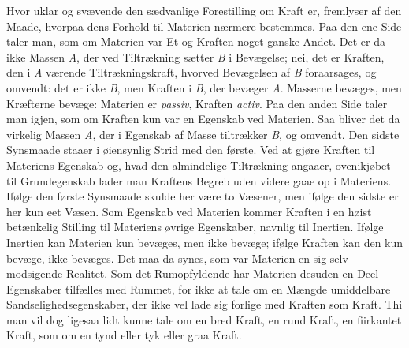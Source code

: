 \documentclass[12pt,a4paper]{book}
\begin{document}
Hvor uklar og svævende den sædvanlige Forestilling om Kraft er,
fremlyser af den Maade, hvorpaa dens Forhold til Materien nærmere
bestemmes. Paa den ene Side taler man, som om Materien var Et og
Kraften noget ganske Andet. Det er da ikke Massen \textit{A}, der ved
Tiltrækning sætter \textit{B} i Bevægelse; nei, det er Kraften, den i
\textit{A} værende Tiltrækningskraft, hvorved Bevægelsen af \textit{B}
foraarsages, og omvendt: det er ikke \textit{B}, men Kraften i
\textit{B}, der bevæger \textit{A}. Masserne bevæges, men Kræfterne
bevæge: Materien er \emph{passiv}, Kraften \emph{activ}. Paa den anden
Side taler man igjen, som om Kraften kun var en Egenskab ved Materien.
Saa bliver det da virkelig Massen \textit{A}, der i Egenskab af Masse
tiltrækker \textit{B}, og omvendt. Den sidste Synsmaade staaer i
øiensynlig Strid med den første. Ved at gjøre Kraften til Materiens
Egenskab og, hvad den almindelige Tiltrækning angaaer, ovenikjøbet til
Grundegenskab lader man Kraftens Begreb uden videre gaae op i
Materiens. Ifølge den første Synsmaade skulde her være to Væsener, men
ifølge den sidste er her kun eet Væsen. Som Egenskab ved Materien
kommer Kraften i en høist betænkelig Stilling til Materiens øvrige
Egenskaber, navnlig til Inertien. Ifølge Inertien kan Materien kun
bevæges, men ikke bevæge; ifølge Kraften kan den kun bevæge, ikke
bevæges. Det maa da synes, som var Materien en sig selv modsigende
Realitet. Som det Rumopfyldende har Materien desuden en Deel
Egenskaber tilfælles med Rummet, for ikke at tale om en Mængde
umiddelbare Sandselighedsegenskaber, der ikke vel lade sig forlige med
Kraften som Kraft. Thi man vil dog ligesaa lidt kunne tale om en bred
Kraft, en rund Kraft, en fiirkantet Kraft, som om en tynd eller tyk
eller graa Kraft.
\end{document}
